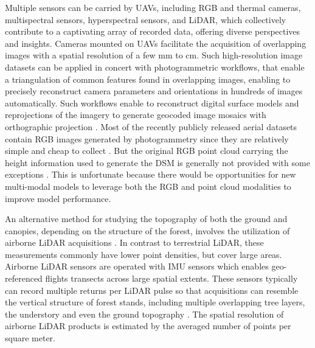 \documentclass{CUP-JNL-DTM}%
\newcommand{\ELc}[1]{\textcolor{orange}{[\textbf{Eti}: #1]}}
\theoremstyle{definition}
\numberwithin{equation}{section}
\begin{document}
Multiple sensors can be carried by UAVs,
including RGB and thermal cameras, multispectral sensors, hyperspectral sensors,
and LiDAR, which collectively contribute to a captivating array of recorded data, offering diverse perspectives and insights.
Cameras mounted on UAVs facilitate the acquisition of overlapping images with a spatial resolution of a few mm to cm.
Such high-resolution image datasets can be applied in concert with photogrammetric workflows, that enable a triangulation of common features found in overlapping images, enabling to precisely reconstruct camera parameters and orientations in hundreds of images automatically. Such workflows enable to reconstruct digital surface models and reprojections of the imagery to generate geocoded image mosaics with orthographic projection \cite{guimaraes_forestry_2020, diez_deep_2021}. 
%
Most of the recently publicly released aerial datasets contain RGB images generated by photogrammetry since they are relatively simple and cheap to collect \cite{morales_automatic_2018, kattenborn_convolutional_2019, kentsch_computer_2020, schiefer_mapping_2020, nguyen_individual_2021, kattenborn_convolutional_2020, galuszynski_automated_2022, reiersen_reforestree_2022}. But the original RGB point cloud carrying the height information used to generate the DSM is generally not provided with some exceptions \cite{brieger_advances_2019, van_geffen_sidroforest_2022}. This is unfortunate because there would be opportunities for new multi-modal models to leverage both the RGB and point cloud modalities to improve model performance.

An alternative method for studying the topography of both the ground and canopies, depending on the structure of the forest, involves the utilization of airborne LiDAR acquisitions \cite{ferraz_carbon_2018, kalinicheva_multi-layer_2022}. 
In contrast to terrestrial LiDAR, these measurements commonly have lower point densities, but cover large areas. 
Airborne LiDAR sensors are operated with IMU sensors which enables geo-referenced flights transects across large spatial extents. 
These sensors typically can record multiple returns per LiDAR pulse so that acquisitions can resemble the vertical structure of forest stands, including multiple overlapping tree layers, the understory and even the ground topography \cite{kalinicheva_multi-layer_2022}.
The spatial resolution of airborne LiDAR products is estimated by the averaged number of points per square meter.
\end{document}
